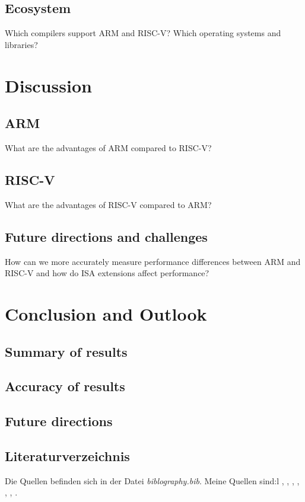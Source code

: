 \documentclass[conference]{IEEEtran}
\begin{document}
	\subsection{Ecosystem}
	Which compilers support ARM and RISC-V? Which operating systems and libraries?


\section{Discussion}
\label{ref:discussion}
	\subsection{ARM}
	What are the advantages of ARM compared to RISC-V?
	\subsection{RISC-V}
	What are the advantages of RISC-V compared to ARM?
	\subsection{Future directions and challenges}
	How can we more accurately measure performance differences between ARM and RISC-V and how do ISA extensions affect performance?

\section{Conclusion and Outlook}
\label{ref:conclusion}
	\subsection{Summary of results}
	\subsection{Accuracy of results}
	\subsection{Future directions}

\subsection{Literaturverzeichnis}
Die Quellen befinden sich in der Datei \textit{biblography.bib}. 
Meine Quellen sind:l \cite{50years}, \cite{ArmManual}, \cite{hennessy2012computer}, \cite{WisconsinMadison2016} \cite{drechsler2020enhanced}, \cite{Asanovic2016}, \cite{IEEE2018} \cite{Dirvin2019}, \cite{Bandic2019}.



\end{document}
